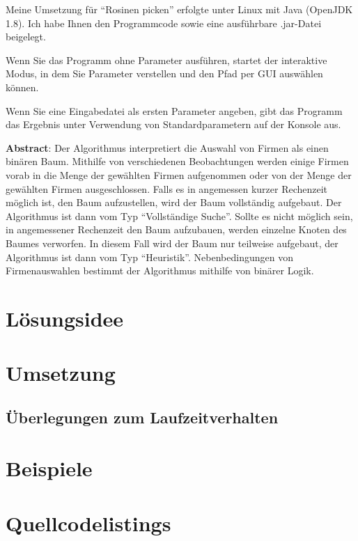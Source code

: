 \documentclass[a4paper, DIV=12, firstfoot=false, dvipsnames]{scrreprt}
\newcommand{\task}[1]{Rosinen picken}
\begin{document}
	\titlehead{Teilnahme 6745 (Team 00001) \hfill Laurenz Grote}
	\title{\task}
	\subtitle{Aufgabe 1}
	\author{Laurenz Friedrich Grote}
	\date{}
	\maketitle
	\tableofcontents
	\vspace {2em}
	Meine Umsetzung für "`\task{}"' erfolgte unter Linux mit Java (OpenJDK 1.8). Ich habe Ihnen den Programmcode sowie eine ausführbare .jar-Datei beigelegt.

	Wenn Sie das Programm ohne Parameter ausführen, startet der interaktive Modus, in dem Sie Parameter verstellen und den Pfad per GUI auswählen können.

	Wenn Sie eine Eingabedatei als ersten Parameter angeben, gibt das Programm das Ergebnis unter Verwendung von Standardparametern auf der Konsole aus.

	\vfill{}
	\textbf{Abstract}:
	Der Algorithmus interpretiert die Auswahl von Firmen als einen binären Baum. Mithilfe von verschiedenen Beobachtungen werden einige Firmen vorab in die Menge der gewählten Firmen aufgenommen oder von der Menge der gewählten Firmen ausgeschlossen. Falls es in angemessen kurzer Rechenzeit möglich ist, den Baum aufzustellen, wird der Baum vollständig aufgebaut. Der Algorithmus ist dann vom Typ "`Vollständige Suche"'. Sollte es nicht möglich sein, in angemessener Rechenzeit den Baum aufzubauen, werden einzelne Knoten des Baumes verworfen. In diesem Fall wird der Baum nur teilweise aufgebaut, der Algorithmus ist dann vom Typ "`Heuristik"'. Nebenbedingungen von Firmenauswahlen bestimmt der Algorithmus mithilfe von binärer Logik. 

	\pagebreak
	\chapter{Lösungsidee}
		
	\chapter{Umsetzung}
		
		\newpage
		\section{Überlegungen zum Laufzeitverhalten}
			
	\chapter{Beispiele}
		
	\chapter{Quellcodelistings}
		
\end{document}
